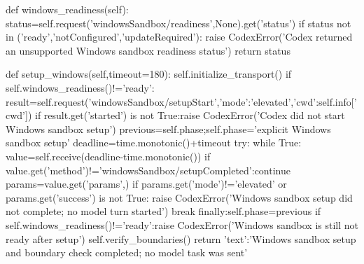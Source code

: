     def windows_readiness(self):
        status=self.request('windowsSandbox/readiness',None).get('status')
        if status not in ('ready','notConfigured','updateRequired'):
            raise CodexError('Codex returned an unsupported Windows sandbox readiness status')
        return status

    def setup_windows(self,timeout=180):
        self.initialize_transport()
        if self.windows_readiness()!='ready':
            result=self.request('windowsSandbox/setupStart',{'mode':'elevated','cwd':self.info['cwd']})
            if result.get('started') is not True:raise CodexError('Codex did not start Windows sandbox setup')
            previous=self.phase;self.phase='explicit Windows sandbox setup'
            deadline=time.monotonic()+timeout
            try:
                while True:
                    value=self.receive(deadline-time.monotonic())
                    if value.get('method')!='windowsSandbox/setupCompleted':continue
                    params=value.get('params',{})
                    if params.get('mode')!='elevated' or params.get('success') is not True:
                        raise CodexError('Windows sandbox setup did not complete; no model turn started')
                    break
            finally:self.phase=previous
            if self.windows_readiness()!='ready':raise CodexError('Windows sandbox is still not ready after setup')
        self.verify_boundaries()
        return {'text':'Windows sandbox setup and boundary check completed; no model task was sent'}

